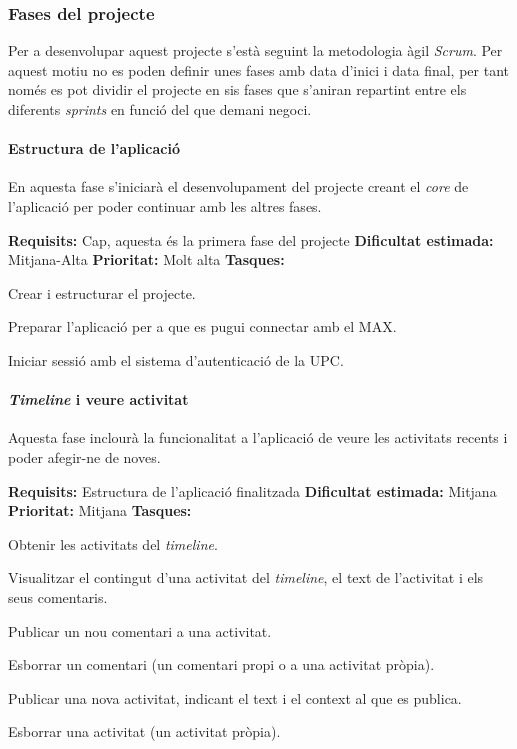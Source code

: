 \subsubsection{Fases del projecte}

Per a desenvolupar aquest projecte s'està seguint la metodologia àgil \textit{Scrum}. Per aquest motiu no es poden definir unes fases amb data d'inici i data final, per tant només es pot dividir el projecte en sis fases que s'aniran repartint entre els diferents \textit{sprints} en funció del que demani negoci.


\paragraph{Estructura de l'aplicació\\}

En aquesta fase s'iniciarà el desenvolupament del projecte creant el \textit{core} de l'aplicació per poder continuar amb les altres fases.

\textbf{Requisits:}  Cap, aquesta és la primera fase del projecte \newline
\textbf{Dificultat estimada:}  Mitjana-Alta \newline
\textbf{Prioritat:}  Molt alta \newline
\textbf{Tasques:} 
\begin{compactitem}
    \item Crear i estructurar el projecte.
    \item Preparar l'aplicació per a que es pugui connectar amb el MAX.
    \item Iniciar sessió amb el sistema d'autenticació de la UPC.
\end{compactitem}


\paragraph{\textit{Timeline} i veure activitat\\}
Aquesta fase inclourà la funcionalitat a l'aplicació de veure les activitats recents i poder afegir-ne de noves.

\textbf{Requisits:}  Estructura de l'aplicació finalitzada \newline
\textbf{Dificultat estimada:}  Mitjana \newline
\textbf{Prioritat:}  Mitjana \newline
\textbf{Tasques:} 
\begin{compactitem}
    \item Obtenir les activitats del \textit{timeline}.
    \item Visualitzar el contingut d'una activitat del \textit{timeline}, el text de l'activitat i els seus comentaris.
    \item Publicar un nou comentari a una activitat.
    \item Esborrar un comentari (un comentari propi o a una activitat pròpia).
    \item Publicar una nova activitat, indicant el text i el context al que es publica.
    \item Esborrar una activitat (un activitat pròpia).
\end{compactitem}


